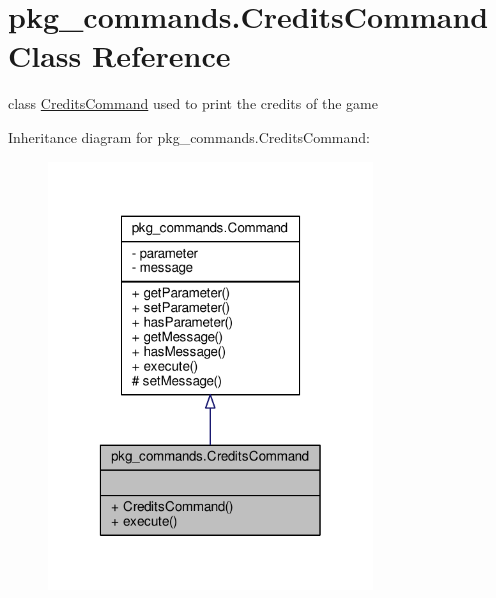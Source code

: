 \hypertarget{classpkg__commands_1_1CreditsCommand}{\section{pkg\-\_\-commands.\-Credits\-Command Class Reference}
\label{classpkg__commands_1_1CreditsCommand}
}


class \hyperlink{classpkg__commands_1_1CreditsCommand}{Credits\-Command} used to print the credits of the game  




Inheritance diagram for pkg\-\_\-commands.\-Credits\-Command\-:\nopagebreak
\begin{figure}[H]
\begin{center}
\leavevmode
\includegraphics[width=244pt]{classpkg__commands_1_1CreditsCommand__inherit__graph}
\end{center}
\end{figure}


